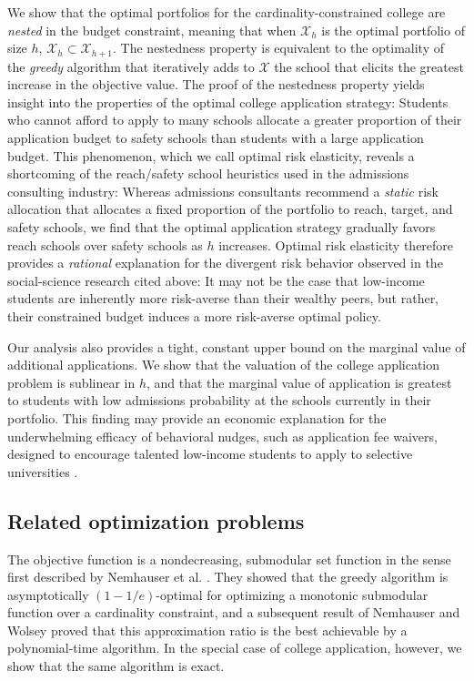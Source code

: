 We show that the optimal portfolios for the cardinality-constrained college are \emph{nested} in the budget constraint, meaning that when $\mathcal{X}_h$ is the optimal portfolio of size $h$, $\mathcal{X}_h \subset \mathcal{X}_{h+1}$. The nestedness property is equivalent to the optimality of the \emph{greedy} algorithm that iteratively adds to $\mathcal{X}$ the school that elicits the greatest increase in the objective value. The proof of the nestedness property yields insight into the properties of the optimal college application strategy: Students who cannot afford to apply to many schools allocate a greater proportion of their application budget to safety schools than students with a large application budget. This phenomenon, which we call optimal risk elasticity, reveals a shortcoming of the reach/safety school heuristics used in the admissions consulting industry: Whereas admissions consultants recommend a \emph{static} risk allocation that allocates a fixed proportion of the portfolio to reach, target, and safety schools, we find that the optimal application strategy gradually favors reach schools over safety schools as $h$ increases. Optimal risk elasticity therefore provides a \emph{rational} explanation for the divergent risk behavior observed in the social-science research cited above: It may not be the case that low-income students are inherently more risk-averse than their wealthy peers, but rather, their constrained budget induces a more risk-averse optimal policy. 

Our analysis also provides a tight, constant upper bound on the marginal value of additional applications. We show that the valuation of the college application problem is sublinear in $h$, and that the marginal value of application is greatest to students with low admissions probability at the schools currently in their portfolio. This finding may provide an economic explanation for the underwhelming efficacy of behavioral nudges, such as application fee waivers, designed to encourage talented low-income students to apply to selective universities \cite{gurantzetal2021}. 

\subsection{Related optimization problems}

The objective function is a nondecreasing, submodular set function in the sense first described by Nemhauser et al. \cite{nemhauseretal1978}. They showed that the greedy algorithm is asymptotically $(1 - 1/e)$-optimal for optimizing a monotonic submodular function over a cardinality constraint, and a subsequent result of Nemhauser and Wolsey \cite{nemhauserandwolsey1978} proved that this approximation ratio is the best achievable by a polynomial-time algorithm. In the special case of college application, however, we show that the same algorithm is exact. 

